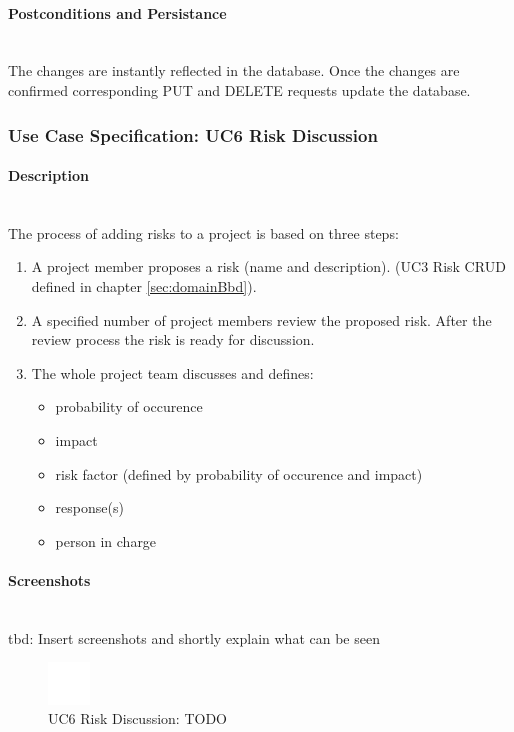 \paragraph*{Postconditions and Persistance}\mbox{}\\
The changes are instantly reflected in the database. Once the changes are confirmed corresponding PUT and DELETE requests update the database.

\newpage
\subsubsection{Use Case Specification: \ac{UC}6 Risk Discussion}
\label{sec:domainBbg}

\paragraph*{Description}\mbox{}\\
The process of adding risks to a project is based on three steps:
\begin{enumerate}
	\vspace{-3mm}
	\setlength\itemsep{-1em}
	
	\item A project member proposes a risk (name and description). (UC3 Risk CRUD defined in chapter \ref{sec:domainBbd}).
	\item A specified number of project members review the proposed risk. After the review process the risk is ready for discussion.
	\item The whole project team discusses and defines:
	\begin{itemize}
		\vspace{-3mm}
		\setlength\itemsep{-1em}
		
		\item probability of occurence
		\item impact
		\item risk factor (defined by probability of occurence and impact)
		\item response(s)
		\item person in charge
	\end{itemize}
\end{enumerate}

\paragraph*{Screenshots}\mbox{}\\
tbd: Insert screenshots and shortly explain what can be seen
\begin{figure}[h] 
	\centering
	\includegraphics[width=0.1\textwidth]{Content/Domain/placeholder.png}
	\caption{\ac{UC}6 Risk Discussion: TODO}
	\label{fig:label6}
\end{figure}

